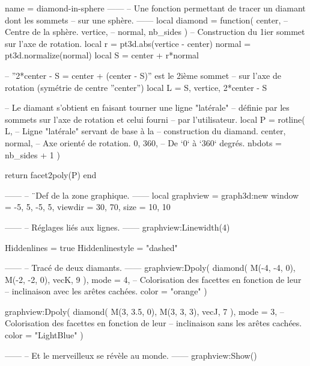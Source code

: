 \documentclass{standalone}
\begin{document}
\begin{luadraw}{name = diamond-in-sphere}
------
-- Une fonction permettant de tracer un diamant dont les sommets
-- sur une sphère.
------
local diamond = function(
  center,   -- Centre de la sphère.
  vertice,  --
  normal,
  nb_sides
)
-- Construction du 1ier sommet sur l'axe de rotation.
  local r = pt3d.abs(vertice - center)
  normal  = pt3d.normalize(normal)
  local S = center + r*normal

-- ''2*center - S = center + (center - S)'' est le 2ième sommet
-- sur l'axe de rotation (symétrie de centre ''center'')
  local L = {S, vertice, 2*center - S}

-- Le diamant s'obtient en faisant tourner une ligne "latérale"
-- définie par les sommets sur l'axe de rotation et celui fourni
-- par l'utilisateur.
  local P = rotline(
    L,                 -- Ligne "latérale" servant de base à la
                       -- construction du diamand.
    {center, normal},  -- Axe orienté de rotation.
    0, 360,            -- De `0` à `360` degrés.
    {nbdots = nb_sides + 1}
  )

  return facet2poly(P)
end

------
-- ¨Def de la zone graphique.
------
local graphview = graph3d:new{
  window  = {-5, 5, -5, 5},
  viewdir = {30, 70},
  size    = {10, 10}
}

------
-- Réglages liés aux lignes.
------
graphview:Linewidth(4)

Hiddenlines     = true
Hiddenlinestyle = "dashed"

------
-- Tracé de deux diamants.
------
graphview:Dpoly(
  diamond(
    M(-4, -4, 0), M(-2, -2, 0), vecK,
    9
  ),
  {
    mode  = 4,  -- Colorisation des facettes en fonction de leur
                -- inclinaison avec les arêtes cachées.
    color = "orange"
  }
)

graphview:Dpoly(
  diamond(
    M(3, 3.5, 0), M(3, 3, 3), vecJ,
    7
  ),
  {
    mode  = 3,  -- Colorisation des facettes en fonction de leur
                -- inclinaison sans les arêtes cachées.
    color = "LightBlue"
  }
)

------
-- Et le merveilleux se révèle au monde.
------
graphview:Show()
\end{luadraw}
\end{document}
